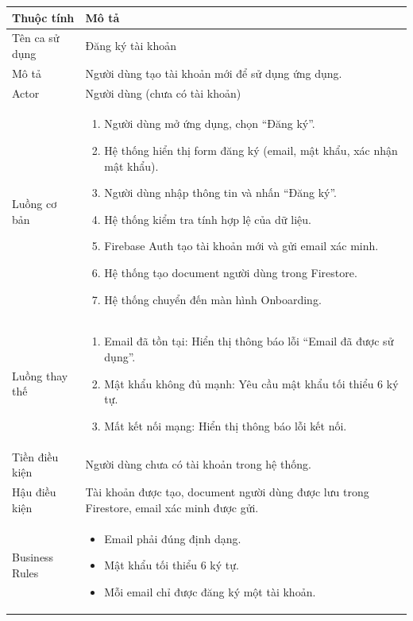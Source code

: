 \begin{longtable}{|p{4cm}|p{11cm}|}
    \hline
    \textbf{Thuộc tính} & \textbf{Mô tả} \\
    \hline
    \endhead
    \hline
    \endfoot
    Tên ca sử dụng & Đăng ký tài khoản \\
    \hline
    Mô tả & Người dùng tạo tài khoản mới để sử dụng ứng dụng. \\
    \hline
    Actor & Người dùng (chưa có tài khoản) \\
    \hline
    Luồng cơ bản &
        \begin{enumerate}[nosep]
            \item Người dùng mở ứng dụng, chọn ``Đăng ký''.
            \item Hệ thống hiển thị form đăng ký (email, mật khẩu, xác nhận mật khẩu).
            \item Người dùng nhập thông tin và nhấn ``Đăng ký''.
            \item Hệ thống kiểm tra tính hợp lệ của dữ liệu.
            \item Firebase Auth tạo tài khoản mới và gửi email xác minh.
            \item Hệ thống tạo document người dùng trong Firestore.
            \item Hệ thống chuyển đến màn hình Onboarding.
        \end{enumerate} \\
    \hline
    Luồng thay thế &
        \begin{enumerate}[nosep]
            \item[3a.] Email đã tồn tại: Hiển thị thông báo lỗi ``Email đã được sử dụng''.
            \item[3b.] Mật khẩu không đủ mạnh: Yêu cầu mật khẩu tối thiểu 6 ký tự.
            \item[3c.] Mất kết nối mạng: Hiển thị thông báo lỗi kết nối.
        \end{enumerate} \\
    \hline
    Tiền điều kiện & Người dùng chưa có tài khoản trong hệ thống. \\
    \hline
    Hậu điều kiện & Tài khoản được tạo, document người dùng được lưu trong Firestore, email xác minh được gửi. \\
    \hline
    Business Rules &
        \begin{itemize}[nosep]
            \item Email phải đúng định dạng.
            \item Mật khẩu tối thiểu 6 ký tự.
            \item Mỗi email chỉ được đăng ký một tài khoản.
        \end{itemize} \\
    \hline
\end{longtable}


